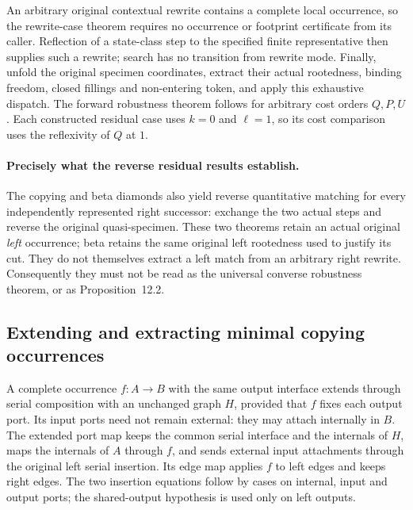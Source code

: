 An arbitrary original contextual rewrite contains a complete local
occurrence, so the rewrite-case theorem requires no occurrence or footprint
certificate from its caller. Reflection of a state-class step to the
specified finite representative then supplies such a rewrite; search has
no transition from rewrite mode. Finally, unfold the original specimen
coordinates, extract their actual rootedness, binding freedom, closed
fillings and non-entering token, and apply this exhaustive dispatch.
The forward robustness theorem follows for arbitrary cost orders $Q,P,U$.
Each constructed residual case uses $k=0$ and $\ell=1$, so its cost
comparison uses the reflexivity of $Q$ at $1$.





\paragraph{Precisely what the reverse residual results establish.}
The copying and beta diamonds also yield reverse quantitative matching for
every independently represented right successor: exchange the two actual
steps and reverse the original quasi-specimen. These two theorems retain an
actual original \emph{left} occurrence; beta retains the same original left
rootedness used to justify its cut. They do not themselves extract a left
match from an arbitrary right rewrite. Consequently they must not be read
as the universal converse robustness theorem, or as Proposition~12.2.



\subsection{Extending and extracting minimal copying occurrences}
A complete occurrence $f:A\to B$ with the same output interface extends
through serial composition with an unchanged graph $H$, provided that $f$
fixes each output port. Its input ports need not remain external: they may
attach internally in $B$. The extended port map keeps the common serial
interface and the internals of $H$, maps the internals of $A$ through $f$,
and sends external input attachments through the original left serial
insertion. Its edge map applies $f$ to left edges and keeps right edges.
The two insertion equations follow by cases on internal, input and output
ports; the shared-output hypothesis is used only on left outputs.

